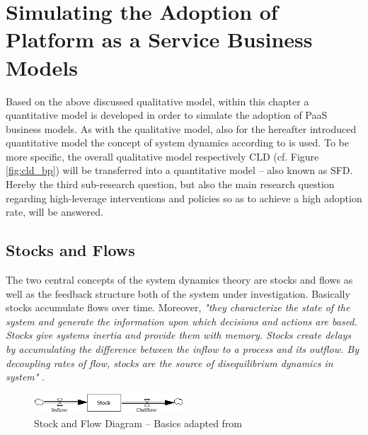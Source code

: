 \chapter{Simulating the Adoption of Platform as a Service Business Models}\label{ch:sfd}

Based on the above discussed qualitative model, within this chapter a quantitative model is developed in order to simulate the adoption of \ac{PaaS} business models. As with the qualitative model, also for the hereafter introduced quantitative model the concept of system dynamics according to \citet{Sterman2000,Sterman2001} is used. To be more specific, the overall qualitative model respectively \ac{CLD} (cf. Figure \ref{fig:cld_bp}) will be transferred into a quantitative model -- also known as \acf{SFD}. Hereby the third sub-research question, but also the main research question regarding high-leverage interventions and policies so as to achieve a high adoption rate, will be answered.

\section{Stocks and Flows}\label{ch:sfd:sf}

The two central concepts of the system dynamics theory are stocks and flows as well as the feedback structure both of the system under investigation. Basically stocks accumulate flows over time. Moreover, \textit{"they characterize the state of the system and generate the information upon which decisions and actions are based. Stocks give systems inertia and provide them with memory. Stocks create delays by accumulating the difference between the inflow to a process and its outflow. By decoupling rates of flow, stocks are the source of disequilibrium dynamics in system"} \citep[p. 192]{Sterman2000}.

\begin{figure}[tb]
	\centering
	\includegraphics[width=0.5\textwidth]{gfx/sfd_basic}
	\caption[Stock and Flow Diagram -- Basics]{Stock and Flow Diagram -- Basics adapted from \citet[p. 194]{Sterman2000}}
	\label{fig:sfd_b}
\end{figure}

